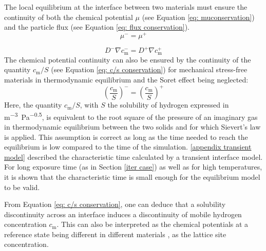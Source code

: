 The local equilibrium at the interface between two materials must ensure  the continuity of both the chemical potential $\mu$ (see Equation \ref{eq: muconservation}) and the particle flux (see Equation \ref{eq: flux conservation}).
\begin{equation}
            \mu^- = \mu^+  \label{eq: muconservation}  
\end{equation}
    
\begin{equation}
        D^- \nabla c_\mathrm{m}^- = D^+ \nabla c_\mathrm{m}^+ \label{eq: flux conservation} 
\end{equation}
The chemical potential continuity can also be ensured by the continuity of the quantity $c_\mathrm{m}/S$ (see Equation \ref{eq: c/s conservation}) for mechanical stress-free materials in thermodynamic equilibrium and the Soret effect being neglected:
\begin{equation}
                \left(\frac{c_\mathrm{m}}{S}\right)^- = \left(\frac{c_\mathrm{m}}{S}\right)^+  \label{eq: c/s conservation}  
\end{equation}
Here, the quantity $c_\mathrm{m}/S$, with $S$ the solubility of hydrogen expressed in \si{m^{-3}.Pa^{-0.5}}, is equivalent to the root square of the pressure of an imaginary gas in thermodynamic equilibrium between the two solids and for which Sievert's law is applied.  
This assumption is correct as long as the time needed to reach the equilibrium is low compared to the time of the simulation.
\ref{appendix transient model} described the characteristic time calculated by a transient interface model.
For long exposure time (as in Section \ref{iter case}) as well as for high temperatures, it is shown that the characteristic time is small enough for the equilibrium model to be valid.

From Equation \ref{eq: c/s conservation}, one can deduce that a solubility discontinuity across an interface induces a discontinuity of mobile hydrogen concentration $c_\mathrm{m}$.
This can also be interpreted as the chemical potentials at a reference state being different in different materials , as the lattice site concentration.


